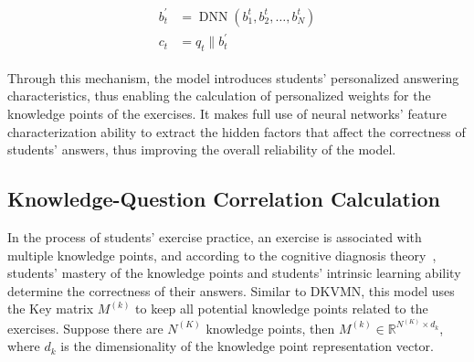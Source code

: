 \begin{align}\label{fml:ch3-sbcap}
    \begin{split}
        b^{\prime}_t &= \operatorname{DNN}(b_1^t,b_2^t,\ldots,b_N^t) \\
        c_t &= q_t\|b^{\prime}_t
    \end{split}
\end{align}

Through this mechanism, the model introduces students' personalized answering characteristics, thus enabling the calculation of personalized weights for the knowledge points of the exercises. It makes full use of neural networks' feature characterization ability to extract the hidden factors that affect the correctness of students' answers, thus improving the overall reliability of the model.

\subsection{Knowledge-Question Correlation Calculation}

In the process of students' exercise practice, an exercise is associated with multiple knowledge points, and according to the cognitive diagnosis theory~\cite{chiu2018cognitive}, students' mastery of the knowledge points and students' intrinsic learning ability determine the correctness of their answers. Similar to DKVMN, this model uses the Key matrix \(M^{(k)}\) to keep all potential knowledge points related to the exercises. Suppose there are \(N^{(K)}\) knowledge points, then \(M^{(k)}\in\mathbb{R}^{{N^{(K)}}\times d_k}\), where \(d_k\) is the dimensionality of the knowledge point representation vector.


